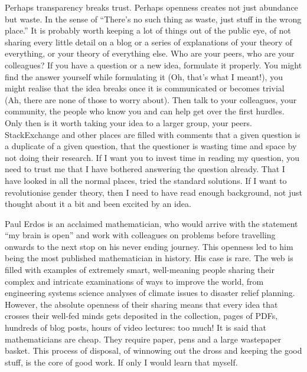 Perhaps transparency breaks trust. Perhaps openness creates not just
abundance but waste. In the sense of ``There's no such thing as waste,
just stuff in the wrong place.'' It is probably worth keeping a lot of
things out of the public eye, of not sharing every little detail on a
blog or a series of explanations of your theory of everything, or your
theory of everything else. Who are your peers, who are your colleagues?
If you have a question or a new idea, formulate it properly. You might
find the answer yourself while formulating it (Oh, that's what I
meant!), you might realise that the idea breaks once it is communicated
or becomes trivial (Ah, there are none of those to worry about). Then
talk to your colleagues, your community, the people who know you and can
help get over the first hurdles. Only then is it worth taking your idea
to a larger group, your peers. StackExchange and other places are filled
with comments that a given question is a duplicate of a given question,
that the questioner is wasting time and space by not doing their
research. If I want you to invest time in reading my question, you need
to trust me that I have bothered answering the question already. That I
have looked in all the normal places, tried the standard solutions. If I
want to revolutionise gender theory, then I need to have read enough
background, not just thought about it a bit and been excited by an idea.

Paul Erdos is an acclaimed mathematician, who would arrive with the
statement ``my brain is open'' and work with colleagues on problems
before travelling onwards to the next stop on his never ending journey.
This openness led to him being the most published mathematician in
history. His case is rare. The web is filled with examples of extremely
smart, well-meaning people sharing their complex and intricate
examinations of ways to improve the world, from engineering systems
science analyses of climate issues to disaster relief planning. However,
the absolute openness of their sharing means that every idea that
crosses their well-fed minds gets deposited in the collection, pages of
PDFs, hundreds of blog posts, hours of video lectures: too much! It is
said that mathematicians are cheap. They require paper, pens and a large
wastepaper basket. This process of disposal, of winnowing out the dross
and keeping the good stuff, is the core of good work. If only I would
learn that myself.

